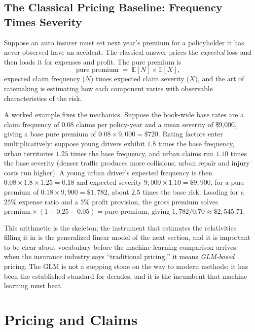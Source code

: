 \documentclass[../ai_in_finance]{subfiles}
\begin{document}
\subsection{The Classical Pricing Baseline: Frequency Times Severity}
\label{sec:ins-pricing}

Suppose an auto insurer must set next year's premium for a policyholder it has never observed have an accident. The classical answer prices the \emph{expected} loss and then loads it for expenses and profit. The pure premium is
\begin{equation*}
\text{pure premium} \;=\; \mathbb{E}[N] \times \mathbb{E}[X],
\end{equation*}
expected claim frequency ($N$) times expected claim severity ($X$), and the art of ratemaking is estimating how each component varies with observable characteristics of the risk.

A worked example fixes the mechanics. Suppose the book-wide base rates are a claim frequency of $0.08$ claims per policy-year and a mean severity of \$9{,}000, giving a base pure premium of $0.08 \times 9{,}000 = \$720$. Rating factors enter multiplicatively: suppose young drivers exhibit $1.8$ times the base frequency, urban territories $1.25$ times the base frequency, and urban claims run $1.10$ times the base severity (denser traffic produces more collisions; urban repair and injury costs run higher). A young urban driver's expected frequency is then $0.08 \times 1.8 \times 1.25 = 0.18$ and expected severity $9{,}000 \times 1.10 = \$9{,}900$, for a pure premium of $0.18 \times 9{,}900 = \$1{,}782$, about $2.5$ times the base risk. Loading for a $25\%$ expense ratio and a $5\%$ profit provision, the gross premium solves $\text{premium} \times (1 - 0.25 - 0.05) = \text{pure premium}$, giving $1{,}782 / 0.70 \approx \$2{,}545.71$.

This arithmetic is the skeleton; the instrument that estimates the relativities filling it in is the generalized linear model of the next section, and it is important to be clear about vocabulary before the machine-learning comparison arrives: when the insurance industry says ``traditional pricing,'' it means \emph{GLM-based} pricing. The GLM is not a stepping stone on the way to modern methods; it has been the established standard for decades, and it is the incumbent that machine learning must beat.

\section{Pricing and Claims}
\end{document}
